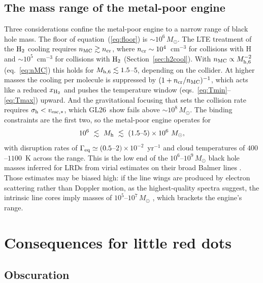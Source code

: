 \documentclass[twocolumn,pdftex]{aastex701}
\newcommand{\msun}{M_{\odot}}
\newcommand{\Mh}{M_{\rm h}}
\newcommand{\mhsix}{M_{\rm h,6}}
\newcommand{\xhh}{x_{\rm H_2}}
\newcommand{\Geq}{\Gamma_{\rm eq}}
\newcommand{\GL}{GL26}
\newcommand{\Htwo}{{\rm H_2}}
\begin{document}
\subsection{The mass range of the metal-poor engine}\label{sec:massrange}

Three considerations confine the metal-poor engine to a narrow range of black hole mass. The floor of equation~(\ref{eq:floor}) is $\sim10^{6}\,\msun$. The LTE treatment of the $\Htwo$ cooling requires $n_{\rm MC}\gtrsim n_{\rm cr}$, where $n_{\rm cr}\sim10^{4}$~cm$^{-3}$ for collisions with H and $\sim10^{5}$~cm$^{-3}$ for collisions with $\Htwo$ (Section~\ref{sec:h2cool}). With $n_{\rm MC}\propto\mhsix^{-2}$ (eq.~\ref{eq:nMC}) this holds for $\mhsix\lesssim1.5$--5, depending on the collider. At higher masses the cooling per molecule is suppressed by $(1+n_{\rm cr}/n_{\rm MC})^{-1}$, which acts like a reduced $\xhh$ and pushes the temperature window (eqs.~\ref{eq:Tmin}--\ref{eq:Tmax}) upward. And the gravitational focusing that sets the collision rate requires $\sigma_{\rm h}<v_{\rm esc,\ast}$, which \GL\ show fails above $\sim10^{8}\,\msun$. The binding constraints are the first two, so the metal-poor engine operates for
\begin{equation}
10^{6}\ \lesssim\ \Mh\ \lesssim\ (1.5\mbox{--}5)\times10^{6}\ \msun,
\end{equation}
with disruption rates of $\Geq\simeq(0.5$--$2)\times10^{-2}$~yr$^{-1}$ and cloud temperatures of $400$--$1100$~K across the range. This is the low end of the $10^{6}$--$10^{9}\,\msun$ black hole masses inferred for LRDs from virial estimates on their broad Balmer lines \citep{Harikane:2023a,Matthee:2024a,Greene:2024a}. Those estimates may be biased high: if the line wings are produced by electron scattering rather than Doppler motion, as the highest-quality spectra suggest, the intrinsic line cores imply masses of $10^{5}$--$10^{7}\,\msun$ \citep{Rusakov:2026a}, which brackets the engine's range.

\section{Consequences for little red dots}\label{sec:lrd}

\subsection{Obscuration}\label{sec:obsc}
\end{document}
